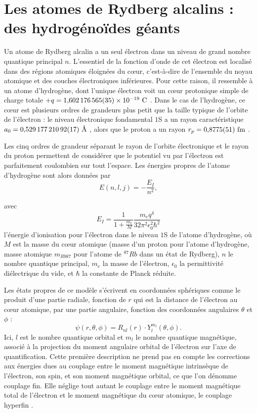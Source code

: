 \section{Les atomes de Rydberg alcalins : des hydrogénoïdes géants}\label{sec:alkalRydberg}
\noindent Un atome de Rydberg alcalin a un seul électron dans un niveau de grand nombre quantique principal $n$. L'essentiel de la fonction d'onde de cet électron est localisé dans des régions atomiques éloignées du c\oe ur, c'est-à-dire de l'ensemble du noyau atomique et des couches électroniques inférieures.
Pour cette raison, il ressemble à un atome d'hydrogène, dont l'unique électron voit un c\oe ur protonique simple de charge totale $+q=\numv{1.602176565(35)d-19}\si{\coulomb}$ \cite{MX_CODATA14}.
Dans le cas de l'hydrogène, ce c\oe ur est plusieurs ordres de grandeurs plus petit que la taille typique de l'orbite de l'électron : le niveau électronique fondamental $1$S a un \og rayon \fg{} caractéristique $a_0 = \numv{0,52917721092(17)}\si{\angstrom}$ \cite{MX_CODATA14}, alors que le proton a un rayon $r_p = \numv{0.8775(51)}\si{\femto\meter}$ \cite{MX_CODATA14}.

Les cinq ordres de grandeur séparant le rayon de l'orbite électronique et le rayon du proton permettent de considérer que le potentiel vu par l'électron est parfaitement coulombien sur tout l'espace.
Les énergies propres de l'atome d'hydrogène sont alors données par
\begin{equation}\label{eq:Hatom}
E(n,l,j)= - \frac{E_I}{n^2} ,
\end{equation}

avec
\begin{equation}\label{eq:E_I}
E_I = \frac{1}{1+\frac{m_e}{M}}\frac{m_e q^4}{32\pi^2 \epsilon _0^2 \hbar ^2}
\end{equation}
l'énergie d'ionisation pour l'électron dans le niveau $1$S de l'atome d'hydrogène, où $M$ est la masse du c\oe ur atomique (masse d'un proton pour l'atome d'hydrogène, masse atomique $m_{Rb87}$ pour l'atome de $^{87}Rb$ dans un état de Rydberg), $n$ le nombre quantique principal, $m_e$ la masse de l'électron, $\epsilon_0$ la permittivité diélectrique du vide, et $\hbar$ la constante de Planck réduite.

Les états propres de ce modèle s'écrivent en coordonnées sphériques comme le produit d'une partie radiale, fonction de $r$ qui est la distance de l'électron au c\oe ur atomique, par une partie angulaire, fonction des coordonnées angulaires $\theta$ et $\phi$ \cite{TXT_COHEN1FR} : 
\begin{equation}\label{eq:Hfonctonde}
\psi(r,\theta,\phi) = R_{nl}(r)\cdot Y_l^{m_l}(\theta,\phi).
\end{equation}
Ici, $l$ est le nombre quantique orbital et $m_l$ le nombre quantique magnétique, associé à la projection du moment angulaire orbital de l'électron sur l'axe de quantification.
Cette première description ne prend pas en compte les corrections aux énergies dues au couplage entre le moment magnétique intrinsèque de l'électron, son spin, et son moment magnétique orbital, ce que l'on dénomme couplage fin.
Elle néglige tout autant le couplage entre le moment magnétique total de l'électron et le moment magnétique du c\oe ur atomique, le couplage hyperfin \cite{TXT_COHEN2FR}.

